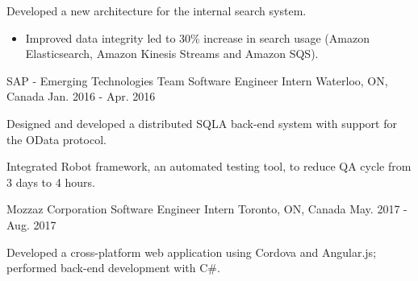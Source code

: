 \begin{cventries}
{\begin{cvitems}
\item {Developed a new architecture for the internal search system.}
\begin{itemize}[label=$\cdot$,leftmargin=0.7em]
\item {Improved data integrity led to 30\% increase in search usage (Amazon Elasticsearch, Amazon Kinesis Streams and Amazon SQS).}
\end{itemize}
\end{cvitems}
}
\cventry
{SAP - Emerging Technologies Team} %
{Software Engineer Intern} %
{Waterloo, ON, Canada} %
{Jan. 2016 - Apr. 2016} %
{ %
\begin{cvitems}
\item {Designed and developed a distributed SQLA back-end system with support for the OData protocol.}
\item {Integrated Robot framework, an automated testing tool, to reduce QA cycle from 3 days to 4 hours.}
\end{cvitems}
}
\cventry
{Mozzaz Corporation} %
{Software Engineer Intern} %
{Toronto, ON, Canada} %
{May. 2017 - Aug. 2017} %
{ %
\begin{cvitems}
\item {Developed a cross-platform web application using Cordova and Angular.js; performed back-end development with C\#.}
\end{cvitems}
}

\end{cventries}
